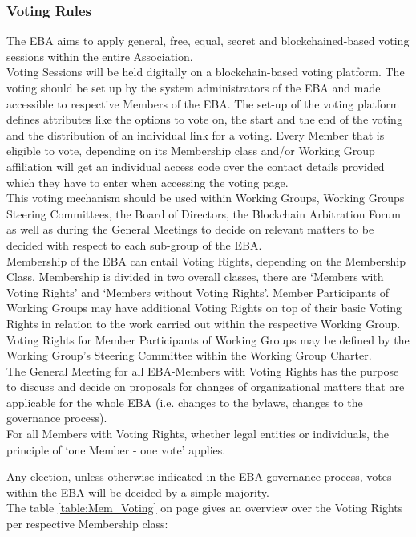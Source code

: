 \documentclass{article}
\begin{document}
\subsubsection{Voting Rules}

The EBA aims to apply general, free, equal, secret and blockchained-based voting sessions within the entire Association. \\
Voting Sessions will be held digitally on a blockchain-based voting platform. 
The voting should be set up by the system administrators of the EBA and made accessible to respective Members of the EBA. 
The set-up of the voting platform defines attributes like the options to vote on, the start and the end of the voting and the distribution of an individual link for a voting. 
Every Member that is eligible to vote, depending on its Membership class and/or Working Group affiliation will get an individual access code over the contact details provided which they have to enter when accessing the voting page. \\
This voting mechanism should be used within Working Groups, Working Groups Steering Committees, the Board of Directors, the Blockchain Arbitration Forum as well as during the General Meetings to decide on relevant matters to be decided with respect to each sub-group of the EBA. \\
Membership of the EBA can entail Voting Rights, depending on the Membership Class. 
Membership is divided in two overall classes, there are ‘Members with Voting Rights’ and ‘Members without Voting Rights’. 
Member Participants of Working Groups may have additional Voting Rights on top of their basic Voting Rights in relation to the work carried out within the respective Working Group. 
Voting Rights for Member Participants of Working Groups may be defined by the Working Group’s Steering Committee within the Working Group Charter. \\
The General Meeting for all EBA-Members with Voting Rights has the purpose to discuss and decide on proposals for changes of organizational matters that are applicable for the whole EBA (i.e. changes to the bylaws, changes to the governance process). \\
For all Members with Voting Rights, whether legal entities or individuals, the principle of ‘one Member - one vote’ applies.

Any election, unless otherwise indicated in the EBA governance process, votes within the EBA will be decided by a simple majority. \\
The table \ref{table:Mem_Voting} on page \pageref{table:Mem_Voting} gives an overview over the Voting Rights per respective Membership class: \\
\end{document}
